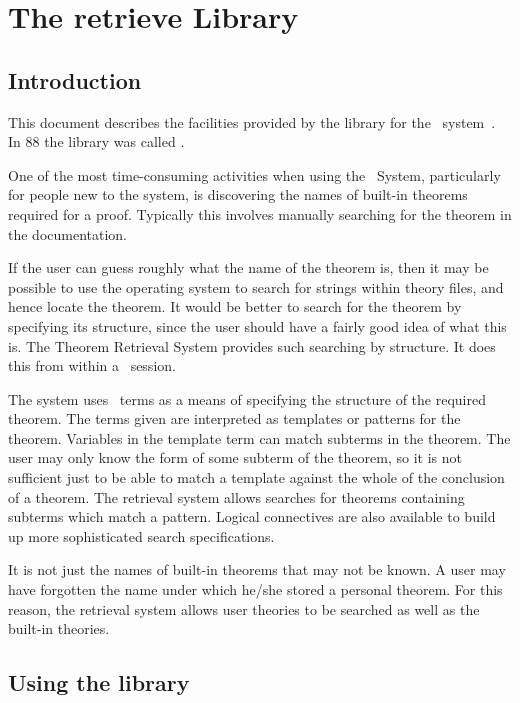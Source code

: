 \chapter{The retrieve Library}

\section{Introduction}

This document describes the facilities provided by the  library
for the \HOL\ system~\cite{HOLbook,ImplHOL}. In {\HOL}88 the library was
called .

One of the most time-consuming activities when using the \HOL\ System,
particularly for people new to the system, is discovering the names of
built-in theorems required for a proof. Typically this involves manually
searching for the theorem in the documentation.

If the user can guess roughly what the name of the theorem is, then it may be
possible to use the operating system to search for strings within theory
files, and hence locate the theorem. It would be better to search for the
theorem by specifying its structure, since the user should have a fairly good
idea of what this is. The Theorem Retrieval System provides such searching by
structure. It does this from within a \HOL\ session.

The system uses \HOL\ terms as a means of specifying the structure of the
required theorem. The terms given are interpreted as templates or patterns
for the theorem. Variables in the template term can match subterms in the
theorem. The user may only know the form of some subterm of the theorem, so
it is not sufficient just to be able to match a template against the whole of
the conclusion of a theorem. The retrieval system allows searches for theorems
containing subterms which match a pattern. Logical connectives are also
available to build up more sophisticated search specifications.

It is not just the names of built-in theorems that may not be known. A user
may have forgotten the name under which he/she stored a personal theorem.
For this reason, the retrieval system allows user theories to be searched
as well as the built-in theories.


\section{Using the library}

